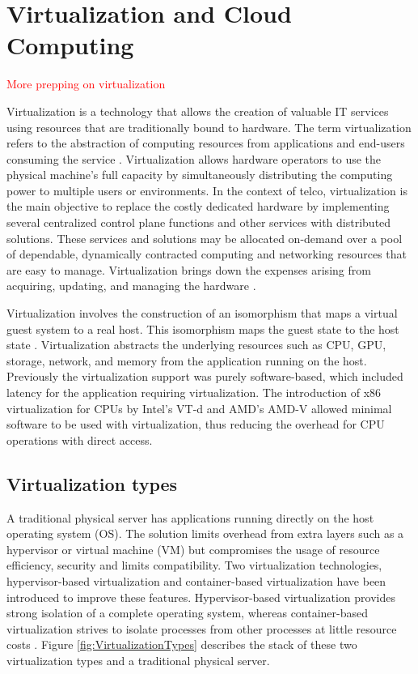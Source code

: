 \chapter{Virtualization and Cloud Computing}
\label{chapter:cloudcomputing}

\textcolor{red}{More prepping on virtualization}

Virtualization is a technology that allows the creation of valuable IT services using resources that are traditionally bound to hardware. The term virtualization refers to the abstraction of computing resources from applications and end-users consuming the service \cite{Xing2012}. Virtualization allows hardware operators to use the physical machine's full capacity by simultaneously distributing the computing power to multiple users or environments. \cite{RedHat} In the context of telco, virtualization is the main objective to replace the costly dedicated hardware by implementing several centralized control plane functions and other services with distributed solutions. These services and solutions may be allocated on-demand over a pool of dependable, dynamically contracted computing and networking resources that are easy to manage\cite{Bosch2011}. Virtualization brings down the expenses arising from acquiring, updating, and managing the hardware \cite{Lingayat2018}\cite{Toimela2017}.

Virtualization involves the construction of an isomorphism that maps a virtual guest system to a real host. This isomorphism maps the guest state to the host state \cite{Xing2012}. Virtualization abstracts the underlying resources such as CPU, GPU, storage, network, and memory from the application running on the host. Previously the virtualization support was purely software-based, which included latency for the application requiring virtualization. The introduction of x86 virtualization for CPUs by Intel's VT-d and AMD's AMD-V allowed minimal software to be used with virtualization, thus reducing the overhead for CPU operations with direct access.

\section{Virtualization types}

A traditional physical server has applications running directly on the host operating system (OS). The solution limits overhead from extra layers such as a hypervisor or virtual machine (VM) but compromises the usage of resource efficiency, security and limits compatibility. Two virtualization technologies, hypervisor-based virtualization and container-based virtualization have been introduced to improve these features. Hypervisor-based virtualization provides strong isolation of a complete operating system, whereas container-based virtualization strives to isolate processes from other processes at little resource costs \cite{Eder2016}. Figure \ref{fig:VirtualizationTypes} describes the stack of these two virtualization types and a traditional physical server.

